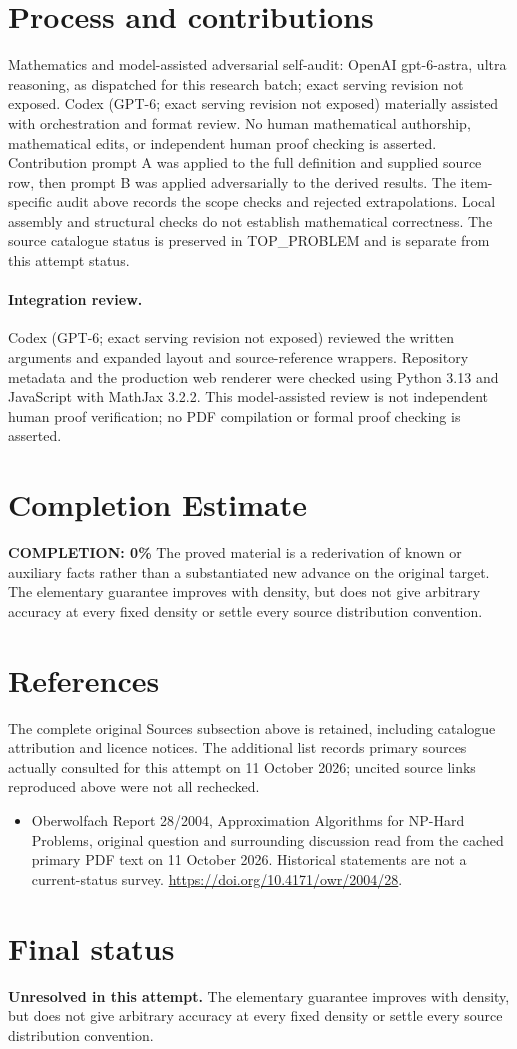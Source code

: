 \documentclass[11pt]{article}
\begin{document}
\section{Process and contributions}
Mathematics and model-assisted adversarial self-audit: OpenAI gpt-6-astra, ultra reasoning, as dispatched for this research batch; exact serving revision not exposed. Codex (GPT-6; exact serving revision not exposed) materially assisted with orchestration and format review. No human mathematical authorship, mathematical edits, or independent human proof checking is asserted.
Contribution prompt A was applied to the full definition and supplied source row, then prompt B was applied adversarially to the derived results. The item-specific audit above records the scope checks and rejected extrapolations. Local assembly and structural checks do not establish mathematical correctness. The source catalogue status is preserved in TOP\_PROBLEM and is separate from this attempt status.
\paragraph{Integration review.} Codex (GPT-6; exact serving revision not exposed) reviewed the written arguments and expanded layout and source-reference wrappers. Repository metadata and the production web renderer were checked using Python 3.13 and JavaScript with MathJax 3.2.2. This model-assisted review is not independent human proof verification; no PDF compilation or formal proof checking is asserted.

\section{Completion Estimate}
\noindent\textbf{COMPLETION: 0\%}
The proved material is a rederivation of known or auxiliary facts rather than a substantiated new advance on the original target. The elementary guarantee improves with density, but does not give arbitrary accuracy at every fixed density or settle every source distribution convention.
\section{References}
The complete original Sources subsection above is retained, including catalogue attribution and licence notices. The additional list records primary sources actually consulted for this attempt on 11 October 2026; uncited source links reproduced above were not all rechecked.
\begin{itemize}
\item Oberwolfach Report 28/2004, Approximation Algorithms for NP-Hard Problems, original question and surrounding discussion read from the cached primary PDF text on 11 October 2026. Historical statements are not a current-status survey. \url{https://doi.org/10.4171/owr/2004/28}.
\end{itemize}
\section{Final status}
\textbf{Unresolved in this attempt.} The elementary guarantee improves with density, but does not give arbitrary accuracy at every fixed density or settle every source distribution convention.
\end{document}
